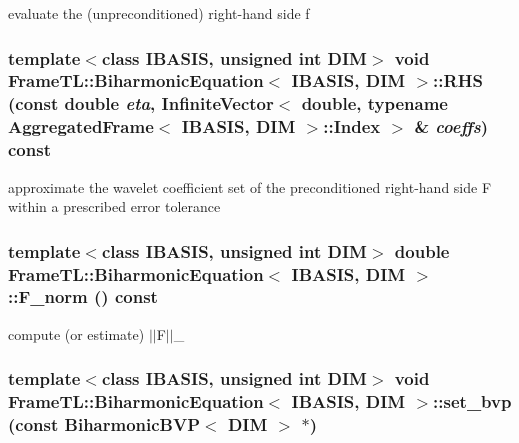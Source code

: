 evaluate the (unpreconditioned) right-hand side f \hypertarget{classFrameTL_1_1BiharmonicEquation_032b924e5b4f43048535d3f2544eb27d}{
\subsubsection[RHS]{\setlength{\rightskip}{0pt plus 5cm}template$<$class IBASIS, unsigned int DIM$>$ void {\bf FrameTL::BiharmonicEquation}$<$ IBASIS, DIM $>$::RHS (const double {\em eta}, \/  InfiniteVector$<$ double, typename {\bf AggregatedFrame}$<$ IBASIS, DIM $>$::{\bf Index} $>$ \& {\em coeffs}) const}}
\label{classFrameTL_1_1BiharmonicEquation_032b924e5b4f43048535d3f2544eb27d}


approximate the wavelet coefficient set of the preconditioned right-hand side F within a prescribed  error tolerance \hypertarget{classFrameTL_1_1BiharmonicEquation_8a83415dd882a4f51ceeaa46c988462f}{
\subsubsection[F\_\-norm]{\setlength{\rightskip}{0pt plus 5cm}template$<$class IBASIS, unsigned int DIM$>$ double {\bf FrameTL::BiharmonicEquation}$<$ IBASIS, DIM $>$::F\_\-norm () const}}
\label{classFrameTL_1_1BiharmonicEquation_8a83415dd882a4f51ceeaa46c988462f}


compute (or estimate) $|$$|$F$|$$|$\_ \hypertarget{classFrameTL_1_1BiharmonicEquation_cf2416d4c035dbe3edf426d8ca032c0f}{
\subsubsection[set\_\-bvp]{\setlength{\rightskip}{0pt plus 5cm}template$<$class IBASIS, unsigned int DIM$>$ void {\bf FrameTL::BiharmonicEquation}$<$ IBASIS, DIM $>$::set\_\-bvp (const BiharmonicBVP$<$ DIM $>$ $\ast$)}}
\label{classFrameTL_1_1BiharmonicEquation_cf2416d4c035dbe3edf426d8ca032c0f}


